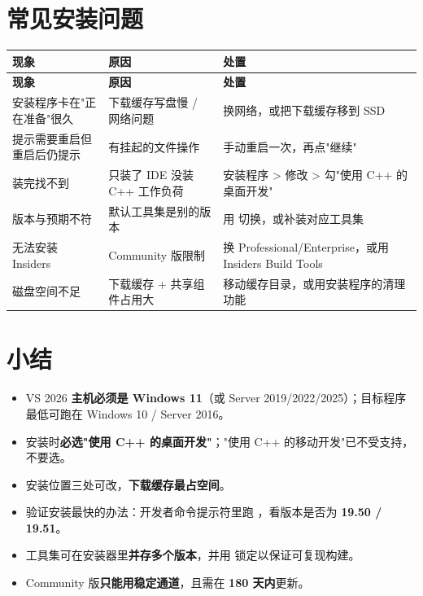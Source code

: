 \section{常见安装问题}
\begin{longtable}{L{3.8cm}L{4.6cm}L{6.2cm}}
\toprule
\textbf{现象} & \textbf{原因} & \textbf{处置} \\
\midrule
\endfirsthead
\toprule
\textbf{现象} & \textbf{原因} & \textbf{处置} \\
\midrule
\endhead
\bottomrule
\endlastfoot
安装程序卡在"正在准备"很久 & 下载缓存写盘慢 / 网络问题 & 换网络，或把下载缓存移到 SSD \\
提示需要重启但重启后仍提示 & 有挂起的文件操作 & 手动重启一次，再点"继续" \\
装完找不到  & 只装了 IDE 没装 C++ 工作负荷 & 安装程序 > 修改 > 勾"使用 C++ 的桌面开发" \\
 版本与预期不符 & 默认工具集是别的版本 & 用  切换，或补装对应工具集 \\
无法安装 Insiders & Community 版限制 & 换 Professional/Enterprise，或用 Insiders Build Tools \\
磁盘空间不足 & 下载缓存 + 共享组件占用大 & 移动缓存目录，或用安装程序的清理功能 \\
\end{longtable}

\section{小结}
\begin{itemize}
  \item VS 2026 \textbf{主机必须是 Windows 11}（或 Server 2019/2022/2025）；目标程序最低可跑在 Windows 10 / Server 2016。
  \item 安装时\textbf{必选"使用 C++ 的桌面开发"}；"使用 C++ 的移动开发"已不受支持，不要选。
  \item 安装位置三处可改，\textbf{下载缓存最占空间}。
  \item 验证安装最快的办法：开发者命令提示符里跑 ，看版本是否为 \textbf{19.50 / 19.51}。
  \item 工具集可在安装器里\textbf{并存多个版本}，并用  锁定以保证可复现构建。
  \item Community 版\textbf{只能用稳定通道}，且需在 \textbf{180 天内}更新。
\end{itemize}

